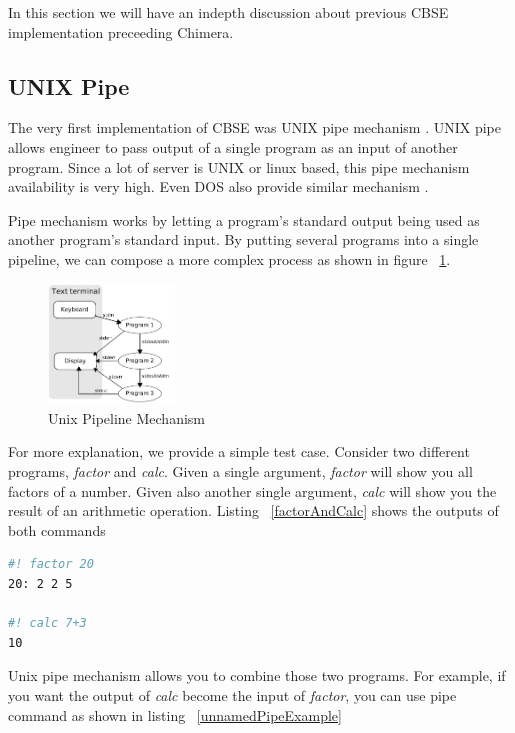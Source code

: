 \documentclass[conference]{IEEEtran}
\begin{document}
In this section we will have an indepth discussion about previous CBSE implementation 
preceeding Chimera.


\subsection{UNIX Pipe}

The very first implementation of CBSE was UNIX pipe mechanism \cite{mcilroy1968mass}. 
UNIX pipe allows engineer to pass output of a single program as an input of 
another program. Since a lot of server is UNIX or linux based, this pipe 
mechanism availability is very high. Even DOS also provide similar mechanism 
\cite{dos7command}.

Pipe mechanism works by letting a program's standard output being used as another
program's standard input. By putting several programs into a single pipeline, we can
compose a more complex process as shown in figure ~\ref{fig:unixPipe}.

\begin{figure}
	\centering
	\includegraphics[width=0.3\textwidth]
		{images/Pipeline.jpg}
	\caption{Unix Pipeline Mechanism}
	\label{fig:unixPipe}
\end{figure}

For more explanation, we provide a simple test case. Consider two different programs,
{\it factor} and {\it calc}. Given a single argument, {\it factor} will show you all 
factors of a number. Given also another single argument, {\it calc} will show you the result 
of an arithmetic operation. Listing ~\ref{factorAndCalc} shows the outputs of both commands

\begin{lstlisting}[caption=Usage of factor and calc, label=factorAndCalc, language=bash, basicstyle=\small, breaklines=true]
#! factor 20
20: 2 2 5

#! calc 7+3 
10
\end{lstlisting}

Unix pipe mechanism allows you to combine those two programs. For example, if you
want the output of {\it calc} become the input of {\it factor}, you can use pipe
command as shown in listing ~\ref{unnamedPipeExample}
\end{document}
